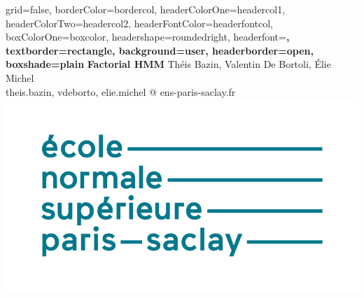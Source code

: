 \documentclass[a0paper,landscape]{baposter}
\begin{document}

\begin{poster}{
grid=false,
borderColor=bordercol, %
headerColorOne=headercol1,
headerColorTwo=headercol2,
headerFontColor=headerfontcol,
boxColorOne=boxcolor,
headershape=roundedright,
headerfont=\Large\sf\bf,
textborder=rectangle,
background=user,
headerborder=open, %
boxshade=plain
}
{}
%
%
{\sf\bf Factorial HMM} %
{Th\'{e}is Bazin, Valentin De Bortoli, \'{E}lie Michel\\ %
{\smaller \textlangle{} theis.bazin, vdeborto, elie.michel \textrangle{} @ ens-paris-saclay.fr}}
{\includegraphics[scale=0.2]{../resources/pictures/logos/logo-ens_paris_saclay.png}} %



\end{poster}
\end{document}
